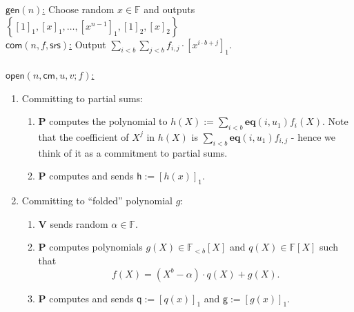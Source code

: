 \documentclass[11pt]{article} %
\newcommand{\F}{\ensuremath{\mathbb F}\xspace}
\newcommand{\srs}{\ensuremath{\mathsf{srs}}\xspace}
\newcommand{\com}{\ensuremath{\mathsf{com}}\xspace}
\newcommand{\cm}{\ensuremath{\mathsf{cm}}\xspace}
\newcommand{\open}{\ensuremath{\mathsf{open}}\xspace}
\newcommand{\defeq}{:=}
\newcommand{\enc}[1]{\ensuremath{\left[#1\right]_1}\xspace}
\newcommand{\enctwo}[1]{\ensuremath{\left[#1\right]_2}\xspace}
\newcommand{\gen}{\ensuremath{\mathsf{gen}}\xspace}
\newcommand{\prv}{\ensuremath{\mathsf{\mathbf{P}}}\xspace}
\newcommand{\ver}{\ensuremath{\mathsf{\mathbf{V}}}\xspace}
\newcommand{\set}[1]{\ensuremath{\left\{#1\right\}}\xspace}
\newcommand{\polysofdeg}[1]{\ensuremath{\F_{< #1}[X]}\xspace}
\newcommand{\polys}{\ensuremath{\F[X]}\xspace}
\newcommand{\sumi}[1]{\sum_{i< #1}}
\newcommand{\sumj}[1]{\sum_{j< #1}}
\newcommand{\h}{\ensuremath{\mathsf{h}}\xspace}
\renewcommand{\g}{\ensuremath{\mathsf{g}}\xspace}
\newcommand{\q}{\ensuremath{\mathsf{q}}\xspace}
\newcommand{\eq}{\ensuremath{\mathsf{eq}}\xspace}
\renewcommand{\eq}{\ensuremath{\mathbf{eq}}\xspace}
\begin{document}
\noindent
\underline{$\gen(n)$:}
Choose random $x\in \F$ and outputs \set{\enc{1},\enc{x},\ldots,\enc{x^{n-1}},\enctwo{1},\enctwo{x}}\\

\noindent
\underline{$\com(n,f,\srs)$:}
 Output $\sumi{b}\sumj{b}f_{i,j}\cdot \enc{x^{i\cdot b + j}}$.\\ \\ 

\noindent
\underline{$\open(n,\cm,u,v;f)$:} \\ \noindent
\begin{enumerate}
 \item \textsf{Committing to partial sums:} \ 
\begin{enumerate}
 \item \prv computes the polynomial to $h(X)\defeq \sumi{b}\eq(i,u_1) f_i(X)$. Note that the coefficient of $X^j$ in $h(X)$ is $\sumi{b}\eq(i,u_1) f_{i,j}$ - hence we think of it as a commitment to partial sums. 
 \item \prv computes and sends $\h\defeq\enc{h(x)}$.
 
 \end{enumerate}
\item \textsf{ Committing to  ``folded'' polynomial $g$:} 
\begin{enumerate}
 \item \ver sends random $\alpha \in \F$.
\item \prv computes polynomials $g(X) \in \polysofdeg{b}$ and $q(X)\in \polys$ such that
\[f(X)=(X^b-\alpha)\cdot q(X) + g(X).\]\label{step:modalpha}
\item \prv computes and sends $\q\defeq \enc{q(x)}$ and $\g\defeq \enc{g(x)}$.

\end{enumerate}


\end{enumerate}
\end{document}

